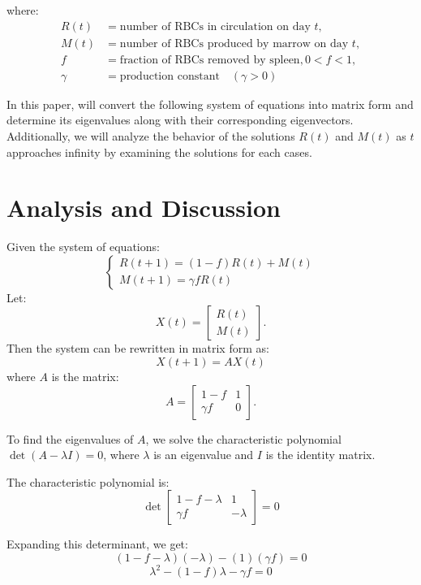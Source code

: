 \documentclass [a4paper]{article}
\begin{document}
where: 
\begin{align*}
  R(t) & = \text{number of RBCs in circulation on day } t, \\
  M(t) & = \text{number of RBCs produced by marrow on day } t, \\
  f & = \text{fraction of RBCs removed by spleen}, 0< f<1,\\
  \gamma & = \text{production constant}   \quad (\gamma > 0) 
\end{align*}

In this paper, will convert the following system of equations into matrix form and determine its eigenvalues along with their corresponding eigenvectors. Additionally, we will analyze the behavior of the solutions \( R(t) \) and \( M(t) \) as \( t \) approaches infinity by examining the solutions for each cases.

\section{Analysis and Discussion}

Given the system of equations:
\[
\begin{cases}
R(t+1) = (1 - f) R(t) + M(t) \\
M(t+1) = \gamma f R(t)
\end{cases}
\]Let:
   \[
   X(t) = \begin{bmatrix} R(t) \\ M(t) \end{bmatrix}.
   \]Then the system can be rewritten in matrix form as:
   \[
   X(t+1) = A X(t)
   \]
where \( A \) is the matrix:
   \[
   A = \begin{bmatrix} 1 - f & 1 \\ \gamma f & 0 \end{bmatrix}.
   \]

To find the eigenvalues of \( A \), we solve the characteristic polynomial \(\det(A - \lambda I) = 0\), where \(\lambda\) is an eigenvalue and \(I\) is the identity matrix.

   The characteristic polynomial is:
   \[
   \det \begin{bmatrix} 1 - f - \lambda & 1 \\ \gamma f & -\lambda \end{bmatrix} = 0
   \]

   Expanding this determinant, we get:
   \[
   (1 - f - \lambda)(-\lambda) - (1)(\gamma f) = 0
   \]
   \[
   \lambda^2 - (1 - f)\lambda - \gamma f = 0
   \]
\end{document}
